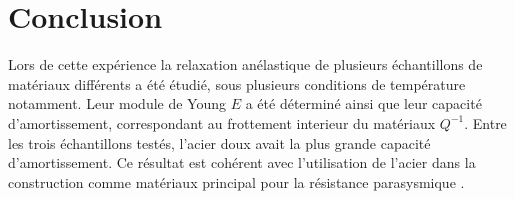 \section{Conclusion}

Lors de cette expérience la relaxation anélastique de plusieurs échantillons de matériaux différents a été étudié, sous plusieurs conditions de température notamment. Leur module de Young \(E\) a été déterminé ainsi que leur capacité d'amortissement, correspondant au frottement interieur du matériaux \(Q^{-1}\). Entre les trois échantillons testés, l'acier doux avait la plus grande capacité d'amortissement. Ce résultat est cohérent avec l'utilisation de l'acier dans la construction comme matériaux principal pour la résistance parasysmique \cite{acier-construction}.
